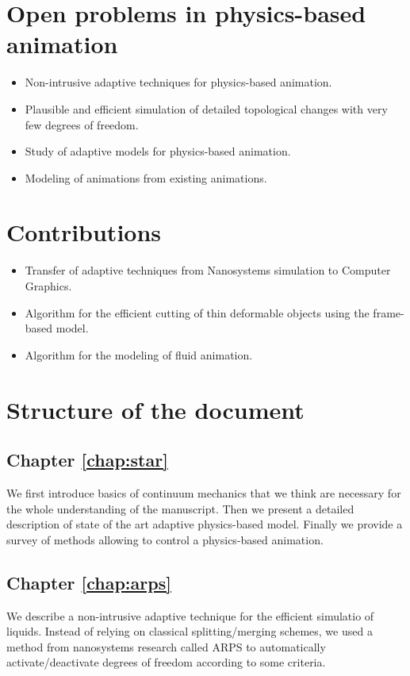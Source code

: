 \documentclass[11pt, oneside, a4paper]{memoir}
\begin{document}
\section{Open problems in physics-based animation}
\begin{itemize}
    \item Non-intrusive adaptive techniques for physics-based animation.
    \item Plausible and efficient simulation of detailed topological changes with very few degrees of freedom.
    \item Study of adaptive models for physics-based animation.
    \item Modeling of animations from existing animations.
\end{itemize}

\section{Contributions}
\begin{itemize}
    \item Transfer of adaptive techniques from Nanosystems simulation to Computer Graphics.
    \item Algorithm for the efficient cutting of thin deformable objects using the frame-based model.
    \item Algorithm for the modeling of fluid animation.
\end{itemize}

\section{Structure of the document}

\subsection*{Chapter \ref{chap:star}}
We first introduce basics of continuum mechanics that we think are necessary for the whole understanding of the manuscript. Then we present a detailed description of state of the art adaptive physics-based model. Finally we provide a survey of methods allowing to control a physics-based animation. \\

\subsection*{Chapter \ref{chap:arps}}
We describe a non-intrusive adaptive technique for the efficient simulatio of liquids. Instead of relying on classical splitting/merging schemes, we used a method from nanosystems research called ARPS to automatically activate/deactivate degrees of freedom according to some criteria. \\
\end{document}
